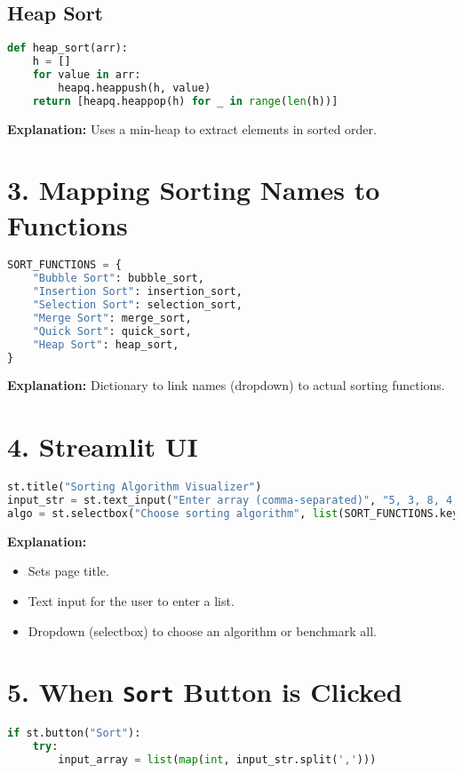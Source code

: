 \documentclass[14pt]{extarticle}
\begin{document}
\subsection*{Heap Sort}
\begin{lstlisting}[language=Python]
def heap_sort(arr):
    h = []
    for value in arr:
        heapq.heappush(h, value)
    return [heapq.heappop(h) for _ in range(len(h))]
\end{lstlisting}

\textbf{Explanation:} Uses a min-heap to extract elements in sorted order.

\section*{3. Mapping Sorting Names to Functions}
\begin{lstlisting}[language=Python]
SORT_FUNCTIONS = {
    "Bubble Sort": bubble_sort,
    "Insertion Sort": insertion_sort,
    "Selection Sort": selection_sort,
    "Merge Sort": merge_sort,
    "Quick Sort": quick_sort,
    "Heap Sort": heap_sort,
}
\end{lstlisting}

\textbf{Explanation:} Dictionary to link names (dropdown) to actual sorting functions.

\section*{4. Streamlit UI}
\begin{lstlisting}[language=Python]
st.title("Sorting Algorithm Visualizer")
input_str = st.text_input("Enter array (comma-separated)", "5, 3, 8, 4, 2")
algo = st.selectbox("Choose sorting algorithm", list(SORT_FUNCTIONS.keys()) + ["All (Test Performance)"])
\end{lstlisting}

\textbf{Explanation:} 
\begin{itemize}
  \item Sets page title.
  \item Text input for the user to enter a list.
  \item Dropdown (selectbox) to choose an algorithm or benchmark all.
\end{itemize}

\section*{5. When \texttt{Sort} Button is Clicked}
\begin{lstlisting}[language=Python]
if st.button("Sort"):
    try:
        input_array = list(map(int, input_str.split(',')))
\end{lstlisting}
\end{document}
